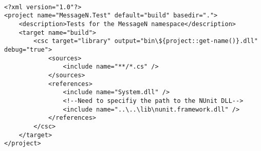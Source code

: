 \begin{verbatim}

<?xml version="1.0"?>
<project name="MessageN.Test" default="build" basedir=".">
    <description>Tests for the MessageN namespace</description>
    <target name="build">
        <csc target="library" output="bin\${project::get-name()}.dll" debug="true">
            <sources>
                <include name="**/*.cs" />
            </sources>
            <references>
                <include name="System.dll" />
                <!--Need to specifiy the path to the NUnit DLL-->
                <include name="..\..\lib\nunit.framework.dll" />
            </references>
        </csc>
    </target>
</project>

\end{verbatim}